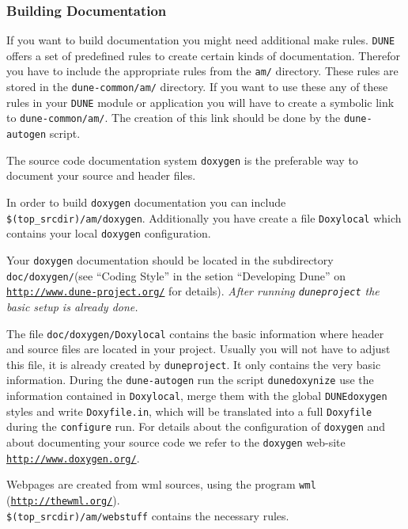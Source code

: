 \documentclass[11pt,a4paper,headinclude,footinclude,DIV16,normalheadings]{scrartcl}
\newcommand{\dune}{\texttt{DUNE}\xspace}
\newcommand{\autogen}{\texttt{dune-autogen}\xspace}
\newcommand{\configure}{\texttt{configure}\xspace}
\newcommand{\duneproject}{\texttt{duneproject}\xspace}
\begin{document}
\subsubsection{Building Documentation}
\label{am_includes}

If you want to build documentation you might need additional make
rules. \dune offers a set of predefined rules to create certain kinds
of documentation. Therefor you have to include the appropriate rules
from the \texttt{am/} directory. These rules are stored in the
\texttt{dune-common/am/} directory. If you want to use these any of
these rules in your \dune module or application you will have to
create a symbolic link to \texttt{dune-common/am/}. The creation of
this link should be done by the \autogen script.


The source code documentation system \texttt{doxygen}\xspace is the
preferable way to document your source and header files.

In order to build \texttt{doxygen} documentation you can include
\texttt{\$(top\_srcdir)/am/doxygen}. Additionally you have create a
file \texttt{Doxylocal} which contains your local \texttt{doxygen}
configuration.

Your \texttt{doxygen} documentation should be located in the
subdirectory \texttt{doc/doxygen/}\xspace (see ``Coding Style'' in the
setion ``Developing Dune'' on
\texttt{\url{http://www.dune-project.org/}} for details). \em After
running \duneproject the basic setup is already done\em.

The file \texttt{doc/doxygen/Doxylocal}\xspace contains the basic
information where header and source files are located in your
project. Usually you will not have to adjust this file, it is already
created by \duneproject. It only
contains the very basic information. During the \texttt{dune-autogen}\xspace
run the script \texttt{dunedoxynize}\xspace use the information contained in
\texttt{Doxylocal}, merge them with the global \dune \texttt{doxygen}\xspace
styles and write \texttt{Doxyfile.in}, which will be translated into a
full \texttt{Doxyfile}\xspace during the \configure run. For details about
the configuration of \texttt{doxygen}\xspace and about documenting your
source code we refer to the \texttt{doxygen}\xspace web-site
\texttt{\url{http://www.doxygen.org/}}.

Webpages are created from wml sources, using the program \texttt{wml}
(\texttt{\url{http://thewml.org/}}).\\
\texttt{\$(top\_srcdir)/am/webstuff} contains the necessary rules.
\end{document}
